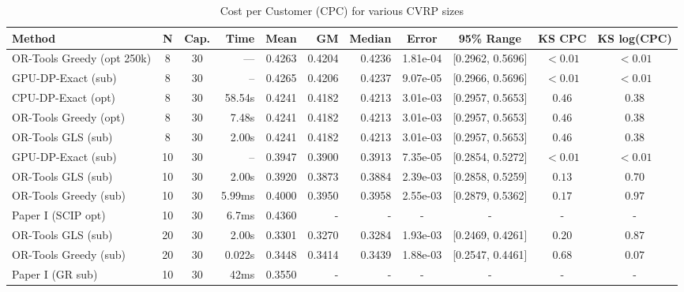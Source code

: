 \documentclass[a4paper,twoside]{article}
\begin{document}
\begin{table}[htbp]
\centering
\caption{Cost per Customer (CPC) for various CVRP sizes}
\label{tab:benchmark-comparison}
\small
\begin{tabular}{@{}l c c r r r r c c c c@{}}
\toprule
\textbf{Method} & \textbf{N} & \textbf{Cap.} & \textbf{Time} & \textbf{Mean} & \textbf{GM} & \textbf{Median} & \textbf{Error} & \textbf{95\% Range} & \textbf{KS CPC} & \textbf{KS log(CPC)} \\
\midrule
OR-Tools Greedy (opt 250k) & 8 & 30 & — & 0.4263 & 0.4204 & 0.4236 & 1.81e-04 & [0.2962, 0.5696] & $<0.01$ & $<0.01$ \\
GPU-DP-Exact (sub)   & 8  & 30 & -- & 0.4265 & 0.4206 & 0.4237 & 9.07e-05 & [0.2966, 0.5696] & $<0.01$ & $<0.01$ \\
CPU-DP-Exact (opt)    & 8 & 30 & 58.54s & 0.4241 & 0.4182 & 0.4213 & 3.01e-03 & [0.2957, 0.5653] & $0.46$ & $0.38$ \\
OR-Tools Greedy (opt) & 8 & 30 & 7.48s & 0.4241 & 0.4182 & 0.4213 & 3.01e-03 & [0.2957, 0.5653] & $0.46$ & $0.38$ \\
OR-Tools GLS (sub)    & 8 & 30 & 2.00s & 0.4241 & 0.4182 & 0.4213 & 3.01e-03 & [0.2957, 0.5653] & $0.46$ & $0.38$ \\
\midrule
GPU-DP-Exact (sub)   & 10 & 30 & --     & 0.3947 & 0.3900 & 0.3913 & 7.35e-05 & [0.2854, 0.5272] & $<0.01$ & $<0.01$ \\
OR-Tools GLS (sub)    & 10 & 30 & 2.00s  & 0.3920 & 0.3873 & 0.3884 & 2.39e-03 & [0.2858, 0.5259] & $0.13$ & $0.70$ \\
OR-Tools Greedy (sub) & 10 & 30 & 5.99ms & 0.4000 & 0.3950 & 0.3958 & 2.55e-03 & [0.2879, 0.5362] & $0.17$ & $0.97$ \\
\rowcolor{gray!20}  Paper I (SCIP opt)    & 10 & 30 & 6.7ms  & 0.4360 & -      & -      & -        & - & - &- \\             
\midrule
OR-Tools GLS (sub)    & 20 & 30 & 2.00s & 0.3301 & 0.3270 & 0.3284 & 1.93e-03 & [0.2469, 0.4261] & $0.20$ & $0.87$ \\
OR-Tools Greedy (sub) & 20 & 30 & 0.022s & 0.3448 & 0.3414 & 0.3439 & 1.88e-03 & [0.2547, 0.4461] & $0.68$ & $0.07$ \\
\rowcolor{gray!20}  Paper I (GR sub)      & 10 & 30 & 42ms  & 0.3550 & -      & -      & -        & - & - &- \\             

\end{tabular}
\end{table}
\end{document}
